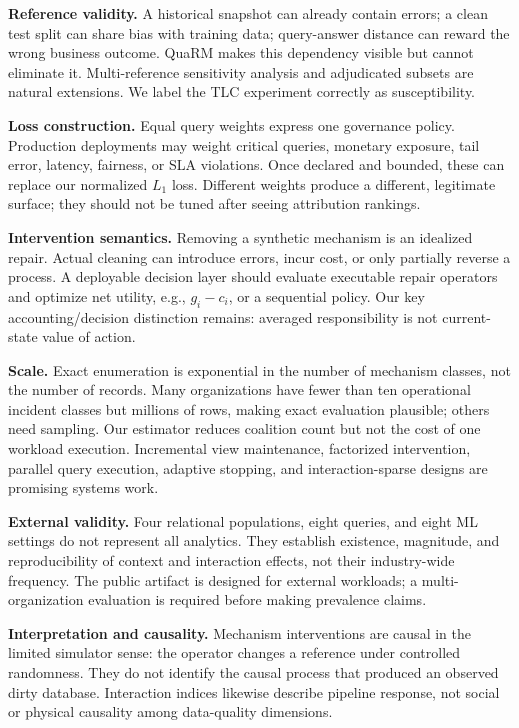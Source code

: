 \documentclass[conference]{IEEEtran}
\newcommand{\method}{QuaRM}
\begin{document}
\textbf{Reference validity.} A historical snapshot can already contain errors; a clean test split can share bias with training data; query-answer distance can reward the wrong business outcome. \method{} makes this dependency visible but cannot eliminate it. Multi-reference sensitivity analysis and adjudicated subsets are natural extensions. We label the TLC experiment correctly as susceptibility.

\textbf{Loss construction.} Equal query weights express one governance policy. Production deployments may weight critical queries, monetary exposure, tail error, latency, fairness, or SLA violations. Once declared and bounded, these can replace our normalized $L_1$ loss. Different weights produce a different, legitimate surface; they should not be tuned after seeing attribution rankings.

\textbf{Intervention semantics.} Removing a synthetic mechanism is an idealized repair. Actual cleaning can introduce errors, incur cost, or only partially reverse a process. A deployable decision layer should evaluate executable repair operators and optimize net utility, e.g., $g_i-c_i$, or a sequential policy. Our key accounting/decision distinction remains: averaged responsibility is not current-state value of action.

\textbf{Scale.} Exact enumeration is exponential in the number of mechanism classes, not the number of records. Many organizations have fewer than ten operational incident classes but millions of rows, making exact evaluation plausible; others need sampling. Our estimator reduces coalition count but not the cost of one workload execution. Incremental view maintenance, factorized intervention, parallel query execution, adaptive stopping, and interaction-sparse designs are promising systems work.

\textbf{External validity.} Four relational populations, eight queries, and eight ML settings do not represent all analytics. They establish existence, magnitude, and reproducibility of context and interaction effects, not their industry-wide frequency. The public artifact is designed for external workloads; a multi-organization evaluation is required before making prevalence claims.

\textbf{Interpretation and causality.} Mechanism interventions are causal in the limited simulator sense: the operator changes a reference under controlled randomness. They do not identify the causal process that produced an observed dirty database. Interaction indices likewise describe pipeline response, not social or physical causality among data-quality dimensions.
\end{document}

